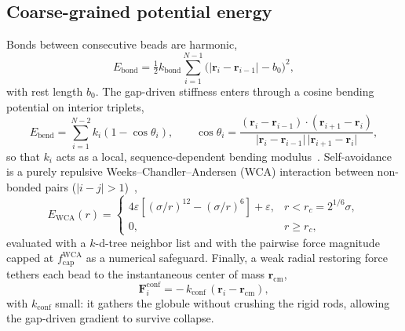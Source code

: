 \documentclass[11pt]{article}
\begin{document}
\subsection{Coarse-grained potential energy}
Bonds between consecutive beads are harmonic,
\begin{equation}
E_{\text{bond}} = \tfrac{1}{2} k_{\text{bond}} \sum_{i=1}^{N-1}
\big(\lvert \mathbf{r}_i - \mathbf{r}_{i-1}\rvert - b_0\big)^2 ,
\end{equation}
with rest length $b_0$. The gap-driven stiffness enters through a cosine bending
potential on interior triplets,
\begin{equation}
E_{\text{bend}} = \sum_{i=1}^{N-2} k_i \left(1 - \cos\theta_i\right),\qquad
\cos\theta_i = \frac{(\mathbf{r}_i-\mathbf{r}_{i-1})\cdot(\mathbf{r}_{i+1}-\mathbf{r}_i)}
{\lvert\mathbf{r}_i-\mathbf{r}_{i-1}\rvert\,\lvert\mathbf{r}_{i+1}-\mathbf{r}_i\rvert},
\end{equation}
so that $k_i$ acts as a local, sequence-dependent bending modulus~\cite{KratkyPorod,Montesi}.
Self-avoidance is a purely repulsive Weeks--Chandler--Andersen (WCA) interaction
between non-bonded pairs ($\lvert i-j\rvert > 1$)~\cite{WCA},
\begin{equation}
E_{\text{WCA}}(r) =
\begin{cases}
4\varepsilon\!\left[(\sigma/r)^{12}-(\sigma/r)^{6}\right] + \varepsilon, & r < r_c = 2^{1/6}\sigma,\\[3pt]
0, & r \ge r_c,
\end{cases}
\end{equation}
evaluated with a $k$-d-tree neighbor list and with the pairwise force magnitude
capped at $f_{\text{cap}}^{\text{WCA}}$ as a numerical safeguard. Finally, a weak
radial restoring force tethers each bead to the instantaneous center of mass
$\mathbf{r}_{\mathrm{cm}}$,
\begin{equation}
\mathbf{F}^{\text{conf}}_i = -\,k_{\text{conf}}\,(\mathbf{r}_i - \mathbf{r}_{\mathrm{cm}}),
\end{equation}
with $k_{\text{conf}}$ small: it gathers the globule without crushing the rigid rods,
allowing the gap-driven gradient to survive collapse.
\end{document}
